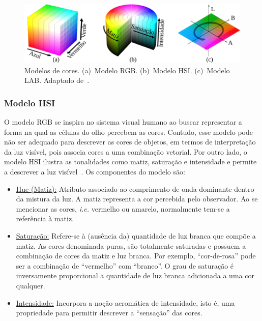 \begin{figure}[!htb]
    \centering
    \includegraphics[scale=0.8]{_fig/modelocores.pdf}
    \caption[Modelos de cores]{Modelos de cores.
    (a)~Modelo RGB.
    (b)~Modelo HSI.
    (c)~Modelo LAB.
    Adaptado de~.}
    \label{figModeloDeCores}
\end{figure}

\subsubsection{Modelo HSI}

O modelo RGB se inspira no sistema visual humano ao buscar representar a forma na qual as células do olho percebem as cores. 
Contudo, esse modelo pode não ser adequado para descrever as cores de objetos, em termos de interpretação da luz visível, pois associa cores a uma combinação vetorial.
Por outro lado, o modelo HSI ilustra as tonalidades como matiz, saturação e intensidade e permite a descrever a luz visível~\cite{Gonzalez2008}.
Os componentes do modelo são:

\begin{itemize}
    
    \item \underline{Hue (Matiz):} Atributo associado ao comprimento de onda dominante dentro da mistura da luz. 
    A matiz representa a cor percebida pelo observador. 
    Ao se mencionar as cores, \textit{i.e.} vermelho ou amarelo, normalmente tem-se a referência à matiz. 
    
    \item \underline{Saturação:} Refere-se à (ausência da) quantidade de luz branca que compõe a matiz.
    As cores denominada puras, são totalmente saturadas e possuem a combinação de cores da matiz e luz branca.
    Por exemplo, ``cor-de-rosa'' pode ser a combinação de ``vermelho'' com ``branco''.
    O grau de saturação é inversamente proporcional a quantidade de luz branca adicionada a uma cor qualquer.
    
    \item \underline{Intensidade:} Incorpora a noção acromática de intensidade, isto é, uma propriedade para permitir descrever a ``sensação'' das cores. 
\end{itemize}

